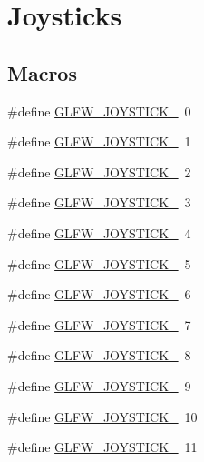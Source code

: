 \hypertarget{group__joysticks}{\section{Joysticks}
\label{group__joysticks}
}
\subsection*{Macros}
\begin{DoxyCompactItemize}
\item 
\#define \hyperlink{group__joysticks_ga34a0443d059e9f22272cd4669073f73d}{G\-L\-F\-W\-\_\-\-J\-O\-Y\-S\-T\-I\-C\-K\-\_}~0
\item 
\#define \hyperlink{group__joysticks_ga6eab65ec88e65e0850ef8413504cb50c}{G\-L\-F\-W\-\_\-\-J\-O\-Y\-S\-T\-I\-C\-K\-\_}~1
\item 
\#define \hyperlink{group__joysticks_gae6f3eedfeb42424c2f5e3161efb0b654}{G\-L\-F\-W\-\_\-\-J\-O\-Y\-S\-T\-I\-C\-K\-\_}~2
\item 
\#define \hyperlink{group__joysticks_ga97ddbcad02b7f48d74fad4ddb08fff59}{G\-L\-F\-W\-\_\-\-J\-O\-Y\-S\-T\-I\-C\-K\-\_}~3
\item 
\#define \hyperlink{group__joysticks_gae43281bc66d3fa5089fb50c3e7a28695}{G\-L\-F\-W\-\_\-\-J\-O\-Y\-S\-T\-I\-C\-K\-\_}~4
\item 
\#define \hyperlink{group__joysticks_ga74771620aa53bd68a487186dea66fd77}{G\-L\-F\-W\-\_\-\-J\-O\-Y\-S\-T\-I\-C\-K\-\_}~5
\item 
\#define \hyperlink{group__joysticks_ga20a9f4f3aaefed9ea5e66072fc588b87}{G\-L\-F\-W\-\_\-\-J\-O\-Y\-S\-T\-I\-C\-K\-\_}~6
\item 
\#define \hyperlink{group__joysticks_ga21a934c940bcf25db0e4c8fe9b364bdb}{G\-L\-F\-W\-\_\-\-J\-O\-Y\-S\-T\-I\-C\-K\-\_}~7
\item 
\#define \hyperlink{group__joysticks_ga87689d47df0ba6f9f5fcbbcaf7b3cecf}{G\-L\-F\-W\-\_\-\-J\-O\-Y\-S\-T\-I\-C\-K\-\_}~8
\item 
\#define \hyperlink{group__joysticks_gaef55389ee605d6dfc31aef6fe98c54ec}{G\-L\-F\-W\-\_\-\-J\-O\-Y\-S\-T\-I\-C\-K\-\_}~9
\item 
\#define \hyperlink{group__joysticks_gae7d26e3df447c2c14a569fcc18516af4}{G\-L\-F\-W\-\_\-\-J\-O\-Y\-S\-T\-I\-C\-K\-\_}~10
\item 
\#define \hyperlink{group__joysticks_gab91bbf5b7ca6be8d3ac5c4d89ff48ac7}{G\-L\-F\-W\-\_\-\-J\-O\-Y\-S\-T\-I\-C\-K\-\_}~11
\item 

\end{DoxyCompactItemize}
